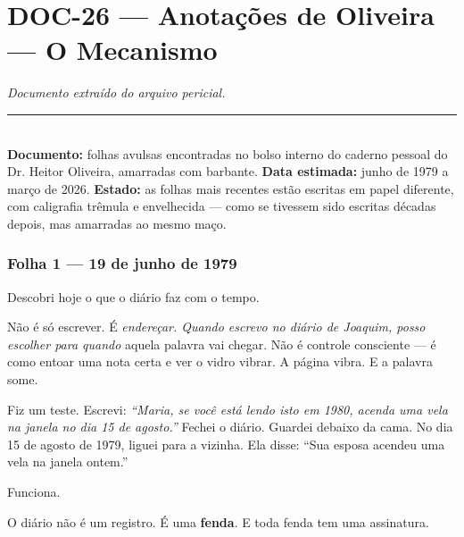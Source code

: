\section*{\textbf{DOC-26} --- Anotações de Oliveira — O Mecanismo}

\noindent \textit{Documento extraído do arquivo pericial.}

\vspace{0.5em}\noindent\rule{\textwidth}{0.5pt}\vspace{0.5em}

\\[-0.2em]

\noindent\textbf{Documento:} folhas avulsas encontradas no bolso interno do caderno pessoal do Dr. Heitor Oliveira, amarradas com barbante. \textbf{Data estimada:} junho de 1979 a março de 2026. \textbf{Estado:} as folhas mais recentes estão escritas em papel diferente, com caligrafia trêmula e envelhecida --- como se tivessem sido escritas décadas depois, mas amarradas ao mesmo maço.

\subsubsection*{Folha 1 --- 19 de junho de 1979}

\noindent Descobri hoje o que o diário faz com o tempo.

\noindent Não é só escrever. É \textit{endereçar\textit{. Quando escrevo no diário de Joaquim, posso escolher }para quando} aquela palavra vai chegar. Não é controle consciente --- é como entoar uma nota certa e ver o vidro vibrar. A página vibra. E a palavra some.

\noindent Fiz um teste. Escrevi: \textit{\textquotedblleft{}Maria, se você está lendo isto em 1980, acenda uma vela na janela no dia 15 de agosto.\textquotedblright{}} Fechei o diário. Guardei debaixo da cama. No dia 15 de agosto de 1979, liguei para a vizinha. Ela disse: \textquotedblleft{}Sua esposa acendeu uma vela na janela ontem.\textquotedblright{}

\noindent Funciona.

\noindent O diário não é um registro. É uma \textbf{fenda}. E toda fenda tem uma assinatura.

